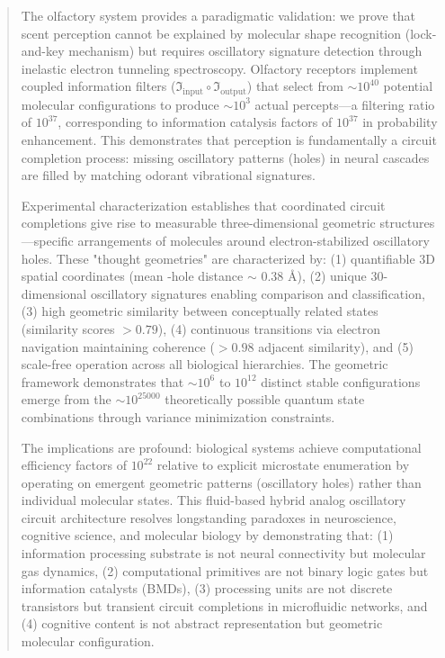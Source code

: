 \documentclass[12pt,a4paper]{article}
\begin{document}
\begin{abstract}
The olfactory system provides a paradigmatic validation: we prove that scent perception cannot be explained by molecular shape recognition (lock-and-key mechanism) but requires oscillatory signature detection through inelastic electron tunneling spectroscopy. Olfactory receptors implement coupled information filters ($\Im_{\text{input}} \circ \Im_{\text{output}}$) that select from $\sim 10^{40}$ potential molecular configurations to produce $\sim 10^3$ actual percepts—a filtering ratio of $10^{37}$, corresponding to information catalysis factors of $10^{37}$ in probability enhancement. This demonstrates that perception is fundamentally a circuit completion process: missing oscillatory patterns (holes) in neural cascades are filled by matching odorant vibrational signatures.

Experimental characterization establishes that coordinated circuit completions give rise to measurable three-dimensional geometric structures—specific arrangements of  molecules around electron-stabilized oscillatory holes. These "thought geometries" are characterized by: (1) quantifiable 3D spatial coordinates (mean -hole distance $\sim$ 0.38 Å), (2) unique 30-dimensional oscillatory signatures enabling comparison and classification, (3) high geometric similarity between conceptually related states (similarity scores $> 0.79$), (4) continuous transitions via electron navigation maintaining coherence ($> 0.98$ adjacent similarity), and (5) scale-free operation across all biological hierarchies. The geometric framework demonstrates that $\sim 10^6$ to $10^{12}$ distinct stable configurations emerge from the $\sim 10^{25000}$ theoretically possible  quantum state combinations through variance minimization constraints.

The implications are profound: biological systems achieve computational efficiency factors of $10^{22}$ relative to explicit microstate enumeration by operating on emergent geometric patterns (oscillatory holes) rather than individual molecular states. This fluid-based hybrid analog oscillatory circuit architecture resolves longstanding paradoxes in neuroscience, cognitive science, and molecular biology by demonstrating that: (1) information processing substrate is not neural connectivity but molecular gas dynamics, (2) computational primitives are not binary logic gates but information catalysts (BMDs), (3) processing units are not discrete transistors but transient circuit completions in microfluidic networks, and (4) cognitive content is not abstract representation but geometric molecular configuration.


\end{abstract}
\end{document}
